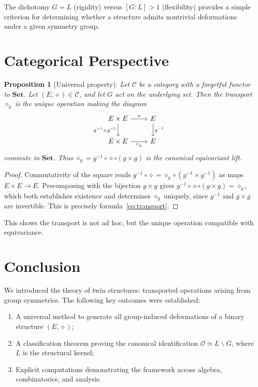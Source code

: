 \documentclass[11pt,a4paper]{article}
\newtheorem{proposition}[theorem]{Proposition}
\begin{document}
	The dichotomy $G = L$ (rigidity) versus $[G:L] > 1$ (flexibility) provides a simple criterion for determining whether a structure admits nontrivial deformations under a given symmetry group.
	
	\section{Categorical Perspective}
	
	\begin{proposition}[Universal property]
		Let $\mathcal{C}$ be a category with a forgetful functor to $\mathbf{Set}$. Let $(E,\diamond) \in \mathcal{C}$, and let $G$ act on the underlying set. Then the transport $\diamond_g$ is the unique operation making the diagram
		\[
		\begin{tikzcd}
			E \times E \arrow[r, "\diamond"] \arrow[d, "g^{-1} \times g^{-1}"'] & E \arrow[d, "g^{-1}"] \\
			E \times E \arrow[r, "\diamond_g"'] & E
		\end{tikzcd}
		\]
		commute in $\mathbf{Set}$. Thus $\diamond_g = g^{-1} \circ \diamond \circ (g \times g)$ is the canonical equivariant lift.
	\end{proposition}
	
	\begin{proof}
		Commutativity of the square reads $g^{-1}\circ\diamond=\diamond_g\circ(g^{-1}\times g^{-1})$ as maps
		$E\times E\to E$. Precomposing with the bijection $g\times g$ gives
		$g^{-1}\circ\diamond\circ(g\times g)=\diamond_g$, which both establishes existence and determines $\diamond_g$
		uniquely, since $g^{-1}$ and $g\times g$ are invertible. This is precisely formula~\eqref{eq:transport}.
	\end{proof}

This shows the transport is not ad hoc, but the unique operation compatible with equivariance.
	
	\section{Conclusion}
	
	We introduced the theory of twin structures: transported operations arising from group symmetries. The following key outcomes were established:
	\begin{enumerate}
		\item A universal method to generate all group-induced deformations of a binary structure $(E, \diamond)$;
		\item A classification theorem proving the canonical identification $\mathcal{O} \simeq L\backslash G$, where $L$ is the structural kernel;
		\item Explicit computations demonstrating the framework across algebra, combinatorics, and analysis.
	\end{enumerate}
	
\end{document}
